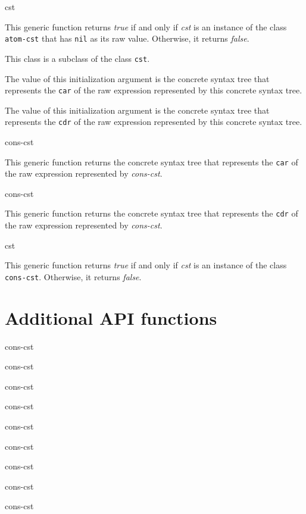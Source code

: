  {cst}

This generic function returns \emph{true} if and only if \textit{cst}
is an instance of the class \texttt{atom-cst} that has \texttt{nil} as
its raw value.  Otherwise, it returns \emph{false}.


This class is a subclass of the class \texttt{cst}.


The value of this initialization argument is the concrete syntax tree
that represents the \texttt{car} of the raw \commonlisp{} expression
represented by this concrete syntax tree.


The value of this initialization argument is the concrete syntax tree
that represents the \texttt{cdr} of the raw \commonlisp{} expression
represented by this concrete syntax tree.

 {cons-cst}

This generic function returns the concrete syntax tree that represents
the \texttt{car} of the raw \commonlisp{} expression represented by
\textit{cons-cst}.

 {cons-cst}

This generic function returns the concrete syntax tree that represents
the \texttt{cdr} of the raw \commonlisp{} expression represented by
\textit{cons-cst}.

 {cst}

This generic function returns \emph{true} if and only if \textit{cst}
is an instance of the class \texttt{cons-cst}.  Otherwise, it returns
\emph{false}.

\section{Additional API functions}

 {cons-cst}

 {cons-cst}

 {cons-cst}

 {cons-cst}

 {cons-cst}

 {cons-cst}

 {cons-cst}

 {cons-cst}

 {cons-cst}
